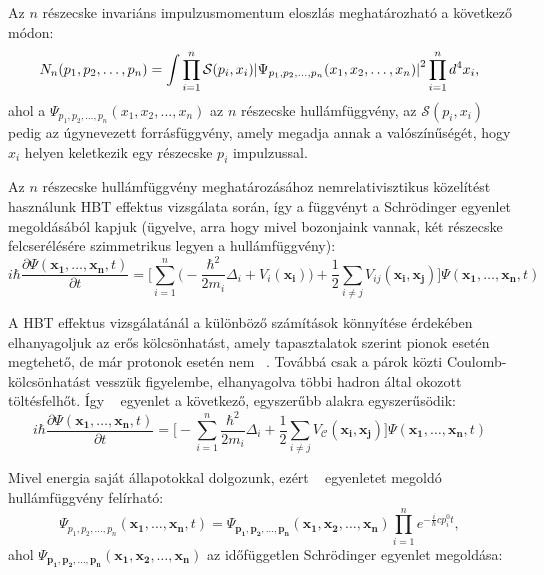 \documentclass[10pt,a4paper]{article}
\numberwithin{equation}{subsection}
\numberwithin{figure}{section}
\begin{document}
Az $n$ részecske invariáns impulzusmomentum eloszlás meghatározható a következő módon:
\begin{equation}
N_n(p_1, p_2, \dots, p_n) = \int \prod_{i=1}^{n}\mathcal{S}(p_i, x_i)\abs{\Psi_{p_1, {p_2}, \dots, {p_n}}({x_1}, {x_2}, \dots, {x_n})}^2\prod_{i=1}^{n}d^4 x_i,
\label{eq:Nn}
\end{equation}
ahol a $\Psi_{p_1, {p_2}, \dots, {p_n}}({x_1}, {x_2}, \dots, {x_n})$ az $n$ részecske hullámfüggvény, az $\mathcal{S}({p_i}, {x_i})$ pedig az úgynevezett forrásfüggvény, amely megadja annak a valószínűségét, hogy ${x_i}$ helyen keletkezik egy részecske ${p_i}$ impulzussal.

Az $n$ részecske hullámfüggvény meghatározásához nemrelativisztikus közelítést használunk HBT effektus vizsgálata során, így a függvényt a Schrödinger egyenlet megoldásából kapjuk (ügyelve, arra hogy mivel bozonjaink vannak, két részecske felcserélésére szimmetrikus legyen a hullámfüggvény):
\begin{equation}
i\hbar\frac{\partial \Psi(\bm{x_1},\dots, \bm{x_n},t )}{\partial t} = \Bigg[\sum_{i=1}^{n}\bigg(-\frac{\hbar^2}{2m_i}\Delta_i + V_i(\bm{x_i})\bigg) + \frac{1}{2}\sum_{i\neq j} V_{ij}(\bm{x_i},\bm{x_j})\Bigg]\Psi(\bm{x_1},\dots, \bm{x_n} ,t)
\label{eq:Sch0}
\end{equation}

A HBT effektus vizsgálatánál a különböző számítások könnyítése érdekében elhanyagoljuk az erős kölcsönhatást, amely tapasztalatok szerint pionok esetén megtehető, de már protonok esetén nem ~\cite{Pratt:1990zq}. Továbbá csak a párok közti Coulomb-kölcsönhatást vesszük figyelembe, elhanyagolva többi hadron által okozott töltésfelhőt. Így ~ egyenlet a következő, egyszerűbb alakra egyszerűsödik:
\begin{equation}
i\hbar\frac{\partial \Psi(\bm{x_1},\dots, \bm{x_n},t )}{\partial t} = \Bigg[-\sum_{i=1}^{n}\frac{\hbar^2}{2m_i}\Delta_i + \frac{1}{2}\sum_{i\neq j} V_\mathcal{C}(\bm{x_i},\bm{x_j})\Bigg]\Psi(\bm{x_1},\dots, \bm{x_n} ,t)
\label{eq:Sch}
\end{equation}

Mivel energia saját állapotokkal dolgozunk, ezért  ~ egyenletet megoldó hullámfüggvény felírható:
\begin{equation}
\Psi_{p_1, {p_2}, \dots, {p_n}}(\bm{x_1},\dots, \bm{x_n},t )  
= \Psi_{\bm{p_1}, \bm{p_2}, \dots, \bm{p_n}}(\bm{x_1}, \bm{x_2}, \dots, \bm{x_n})\prod_{i=1}^ne^{-\frac{i}{\hbar}cp_i^0t},
\end{equation}
ahol $\Psi_{\bm{p_1}, \bm{p_2}, \dots, \bm{p_n}}(\bm{x_1}, \bm{x_2}, \dots, \bm{x_n})$ az időfüggetlen Schrödinger egyenlet megoldása:
\end{document}
